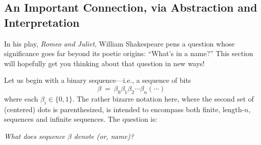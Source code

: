 \subsection{An Important Connection, via Abstraction and Interpretation}
\label{sec:sets-strings-functions}

In his play, {\it Romeo and Juliet}, William Shakespeare
 pens a question
whose significance goes far beyond its poetic origins: ``What's in a
name?''  This section will hopefully get you thinking about that
question in new ways!

Let us begin with a binary sequence---i.e., a sequence of bits
\[ \beta \ = \ \beta_0 \beta_1 \beta_2 \cdots \beta_n (\cdots) \]
where each $\beta_i \in \{0,1\}$.  The rather bizarre notation here,
where the second set of (centered) dots is parenthesized, is intended
to encompass both finite, length-$n$, sequences and infinite
sequences.  The question is:

{\em What does sequence $\beta$ denote (or, name)?}

